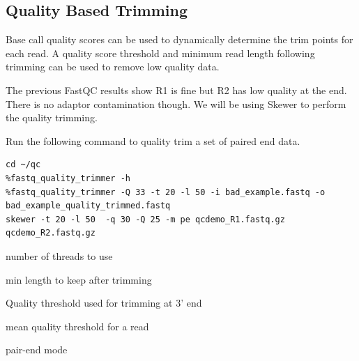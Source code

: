 \subsection{Quality Based Trimming}
Base call quality scores can be used to dynamically determine the trim
points for each read. A quality score threshold and minimum read length
following trimming can be used to remove low quality data.


\begin{steps}

The previous FastQC results show R1 is fine but R2 has low quality at the end. There is no adaptor contamination though.
We will be using Skewer to perform the quality trimming.

Run the following command to quality trim a set of paired end data. %
\begin{lstlisting}
cd ~/qc
%fastq_quality_trimmer -h
%fastq_quality_trimmer -Q 33 -t 20 -l 50 -i bad_example.fastq -o bad_example_quality_trimmed.fastq
skewer -t 20 -l 50  -q 30 -Q 25 -m pe qcdemo_R1.fastq.gz qcdemo_R2.fastq.gz
\end{lstlisting}
\end{steps}


\begin{note}
\begin{description}[style=multiline,labelindent=0cm,align=right,leftmargin=\descriptionlabelspace,rightmargin=1.5cm,font=\ttfamily]
     \item[-t] number of threads to use
     \item[-l] min length to keep after trimming
     \item[-q] Quality threshold used for trimming at 3' end
     \item[-Q] mean quality threshold for a read
     \item[-m] pair-end mode
\end{description}
\end{note}

